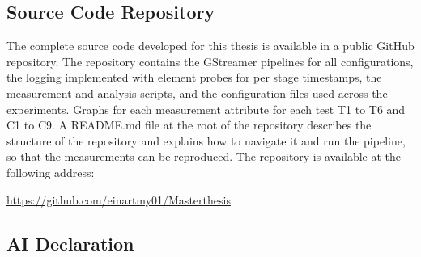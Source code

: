 \appendix
\subsection{Source Code Repository}

The complete source code developed for this thesis is available in a public GitHub repository. The repository contains the GStreamer pipelines for all configurations, the logging implemented with element probes for per stage timestamps, the measurement and analysis scripts, and the configuration files used across the experiments. Graphs for each measurement attribute for each test T1 to T6 and C1 to C9. A README.md file at the root of the repository describes the structure of the repository and explains how to navigate it and run the pipeline, so that the measurements can be reproduced. The repository is available at the following address:

\begin{center}
\url{https://github.com/einartmy01/Masterthesis}
\end{center}

\subsection{AI Declaration}
